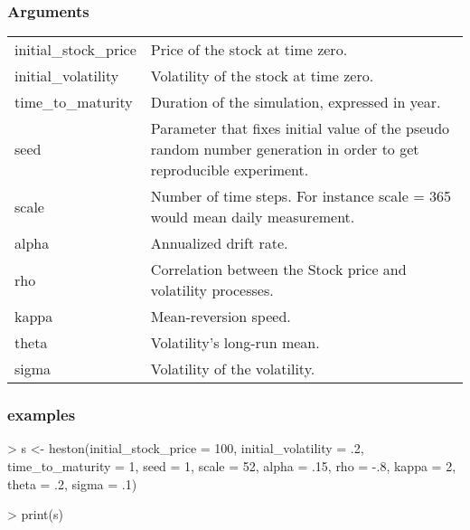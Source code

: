 \documentclass[12pt]{report}
\begin{document}
\begin{appendices}
\subsubsection*{Arguments}

\begin{tabularx}{\textwidth}{lX}
  initial\_stock\_price & Price of the stock at time zero.\\
  initial\_volatility & Volatility of the stock at time zero.\\
  time\_to\_maturity & Duration of the simulation, expressed in year.\\
  seed & Parameter that fixes initial value of the pseudo random number generation in order to get reproducible experiment. \\
  scale & Number of time steps. For instance scale = 365 would mean daily measurement.\\
  alpha & Annualized drift rate. \\
  rho & Correlation between the Stock price and volatility processes.\\
  kappa & Mean-reversion speed. \\
  theta & Volatility's long-run mean. \\
  sigma & Volatility of the volatility. 
\end{tabularx}

\subsubsection*{examples}
\label{sec:r:time:geometric:ex}

\begin{Schunk}
\begin{Sinput}
> s <- heston(initial_stock_price = 100,
             initial_volatility = .2,
             time_to_maturity = 1,
             seed = 1,
             scale = 52,
             alpha = .15,
             rho = -.8,
             kappa = 2,
             theta = .2,
             sigma = .1)
\end{Sinput}
\end{Schunk}


\begin{Schunk}
\begin{Sinput}
> print(s)
\end{Sinput}
\end{Schunk}


\end{appendices}
\end{document}
